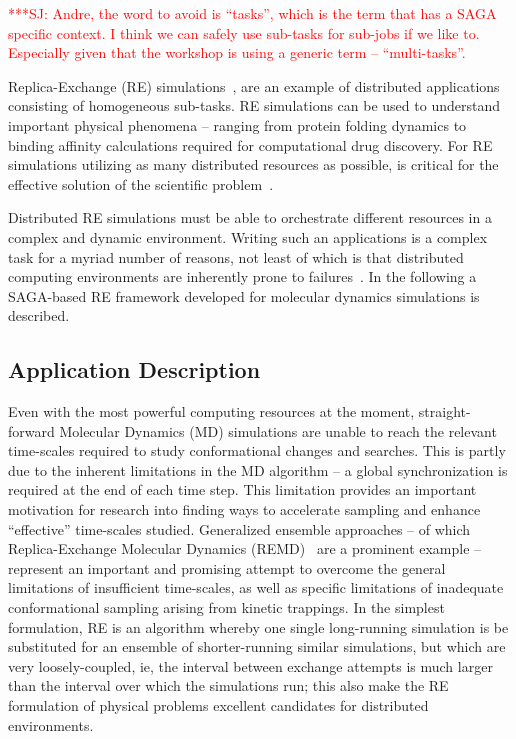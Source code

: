 \documentclass[conference,final]{IEEEtran}
\newcommand{\up}{\vspace*{-1em}}
\newcommand{\jhanote}[1]{ {\textcolor{red} { ***SJ: #1 }}}
\newcommand{\jhanote}[1]{}
\begin{document}
\jhanote{Andre, the word to avoid is ``tasks'', which is the term that
  has a SAGA specific context. I think we can safely use sub-tasks for
  sub-jobs if we like to. Especially given that the workshop is using
  a generic term -- ``multi-tasks''.}

Replica-Exchange (RE) simulations~\cite{Sugita:1999rm},
\cite{hansmann} are an example of distributed applications consisting
of homogeneous sub-tasks. RE simulations can be used to understand
important physical phenomena -- ranging from protein folding dynamics
to binding affinity calculations required for computational drug
discovery.  For RE simulations utilizing as many distributed resources
as possible, is critical for the effective solution of the scientific
problem~\cite{repex_ptrsa}.

Distributed RE simulations must be able to orchestrate different
resources in a complex and dynamic environment.  Writing such an
applications is a complex task for a myriad number of reasons, not
least of which is that distributed computing environments are
inherently prone to failures~\cite{Luckow:2008la}. In the following a
SAGA-based RE framework developed for molecular dynamics simulations
is described.

\up

\subsection{Application Description}

\up


Even with the most powerful computing resources at the moment,
straight-forward Molecular Dynamics (MD) simulations are unable to
reach the relevant time-scales required to study conformational
changes and searches. This is partly due to the inherent limitations
in the MD algorithm -- a global synchronization is required at the end
of each time step.  This limitation provides an important motivation
for research into finding ways to accelerate sampling and enhance
``effective'' time-scales studied. Generalized ensemble approaches --
of which Replica-Exchange Molecular Dynamics
(REMD)~\cite{Sugita:1999rm} are a prominent example -- represent an
important and promising attempt to overcome the general limitations of
insufficient time-scales, as well as specific limitations of
inadequate conformational sampling arising from kinetic trappings.  In
the simplest formulation, RE is an algorithm whereby one
single long-running simulation is be substituted for an ensemble of
shorter-running similar simulations, but which are very
loosely-coupled, ie, the interval between exchange attempts is much
larger than the interval over which the simulations run; this also
make the RE formulation of physical problems excellent
candidates for distributed environments.
\end{document}
